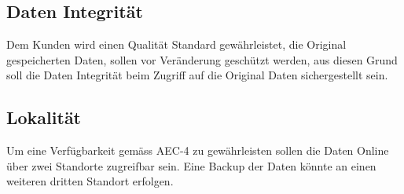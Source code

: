 \subsection{Daten Integrität}
Dem Kunden wird einen Qualität Standard gewährleistet, die Original gespeicherten Daten, sollen vor Veränderung geschützt werden, aus diesen Grund soll die Daten Integrität beim Zugriff auf die Original Daten sichergestellt sein.

\subsection{Lokalität}
Um eine Verfügbarkeit gemäss AEC-4 zu gewährleisten sollen die Daten Online über zwei Standorte zugreifbar sein. Eine Backup der Daten könnte an einen weiteren dritten Standort erfolgen.